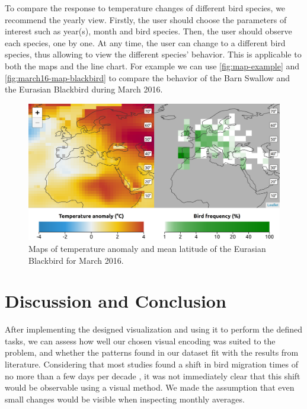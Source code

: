 \documentclass[journal]{vgtc}                %
\begin{document}
To compare the response to temperature changes of different bird species, we recommend the yearly view. Firstly, the user should choose the parameters of interest such as year(s), month and bird species. Then, the user should observe each species, one by one. At any time, the user can change to a different bird species, thus allowing to view the different species' behavior. This is applicable to both the maps and the line chart. For example we can use \autoref{fig:map-example} and \autoref{fig:march16-map-blackbird} to compare the behavior of the Barn Swallow and the Eurasian Blackbird during March 2016.

\begin{figure}[t]
  \centering
  \includegraphics[width=\linewidth]{march16-map-blackbird}
  \caption{Maps of temperature anomaly and mean latitude of the Eurasian Blackbird for March 2016.}
  \label{fig:march16-map-blackbird}
\end{figure}

\section{Discussion and Conclusion}


After implementing the designed visualization and using it to perform the defined tasks, we can assess how well our chosen visual encoding was suited to the problem, and whether the patterns found in our dataset fit with the results from literature. Considering that most studies found a shift in bird migration times of no more than a few days per decade \cite{cotton2003avian}, it was not immediately clear that this shift would be observable using a visual method. We made the assumption that even small changes would be visible when inspecting monthly averages.
\end{document}
